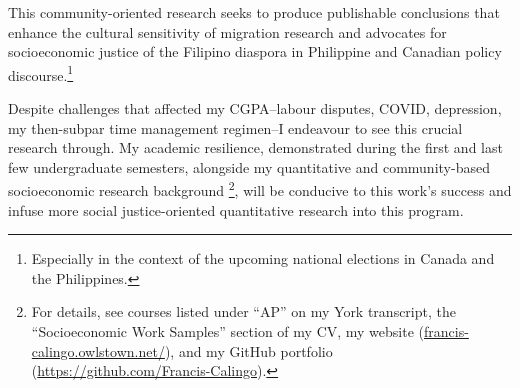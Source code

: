 \documentclass{article}
\begin{document}
\vspace{10pt}

This community-oriented research seeks to produce publishable conclusions that enhance the cultural sensitivity of migration research and advocates for socioeconomic justice of the Filipino diaspora in Philippine and Canadian policy discourse.\footnote{Especially in the context of the upcoming national elections in Canada and the Philippines.}

\vspace{10pt}

Despite challenges that affected my CGPA–labour disputes, COVID, depression, my then-subpar time management regimen–I endeavour to see this crucial research through. My academic resilience, demonstrated during the first and last few undergraduate semesters, alongside my quantitative and community-based socioeconomic research background \footnote{For details, see courses listed under “AP” on my York transcript, the “Socioeconomic Work Samples” section of my CV, my website (\url{francis-calingo.owlstown.net/}), and my GitHub portfolio (\url{https://github.com/Francis-Calingo}).}, will be conducive to this work’s success and infuse more social justice-oriented quantitative research into this program.

\vspace{10pt}

\url{}
\end{document}
